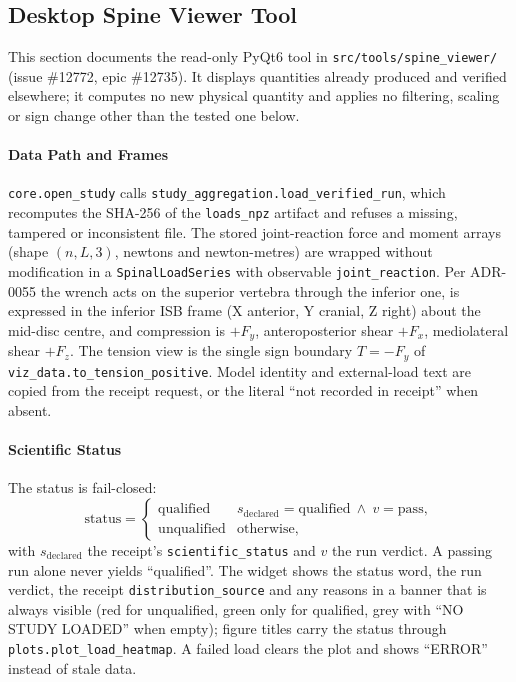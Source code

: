 \subsection{Desktop Spine Viewer Tool}
\label{sec:spn-15b}

This section documents the read-only PyQt6 tool in \texttt{src/tools/spine\_viewer/}
(issue \#12772, epic \#12735). It displays quantities already produced and
verified elsewhere; it computes no new physical quantity and applies no
filtering, scaling or sign change other than the tested one below.

\paragraph{Data Path and Frames}
\texttt{core.open\_study} calls \texttt{study\_aggregation.load\_verified\_run},
which recomputes the SHA-256 of the \texttt{loads\_npz} artifact and refuses a
missing, tampered or inconsistent file. The stored joint-reaction force and
moment arrays (shape $(n,L,3)$, newtons and newton-metres) are wrapped without
modification in a \texttt{SpinalLoadSeries} with observable
\texttt{joint\_reaction}. Per ADR-0055 the wrench acts on the superior vertebra
through the inferior one, is expressed in the inferior ISB frame (X anterior,
Y cranial, Z right) about the mid-disc centre, and compression is $+F_y$,
anteroposterior shear $+F_x$, mediolateral shear $+F_z$. The tension view is the
single sign boundary $T=-F_y$ of \texttt{viz\_data.to\_tension\_positive}.
Model identity and external-load text are copied from the receipt request, or
the literal ``not recorded in receipt'' when absent.

\paragraph{Scientific Status}
The status is fail-closed:
\begin{equation}
  \text{status} =
  \begin{cases}
    \text{qualified} & s_{\mathrm{declared}}=\text{qualified}\ \wedge\ v=\text{pass},\\
    \text{unqualified} & \text{otherwise,}
  \end{cases}
\end{equation}
with $s_{\mathrm{declared}}$ the receipt's \texttt{scientific\_status} and $v$
the run verdict. A passing run alone never yields ``qualified''. The widget
shows the status word, the run verdict, the receipt \texttt{distribution\_source}
and any reasons in a banner that is always visible (red for unqualified, green
only for qualified, grey with ``NO STUDY LOADED'' when empty); figure titles
carry the status through \texttt{plots.plot\_load\_heatmap}. A failed load clears
the plot and shows ``ERROR'' instead of stale data.

